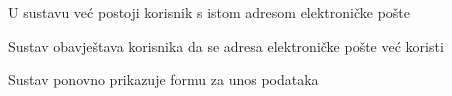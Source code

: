 \begin{packed_item}
\begin{packed_item}
\begin{packed_enum}
							\end{packed_enum}
							
							\item[4.a] U sustavu već postoji korisnik s istom adresom elektroničke pošte
							\item[] \begin{packed_enum}
								
								\item Sustav obavještava korisnika da se adresa elektroničke pošte već koristi
								
								\item Sustav ponovno prikazuje formu za unos podataka
								
							\end{packed_enum}
							

						\end{packed_item}
					\end{packed_item}
					
